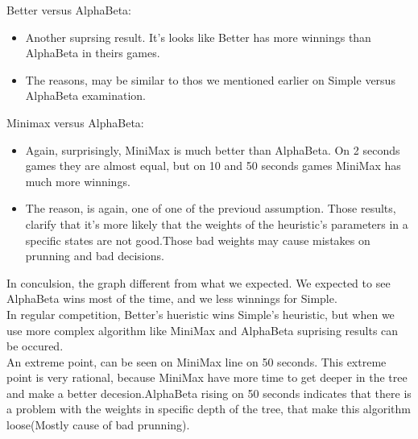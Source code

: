 \documentclass{article}
\begin{document}
Better versus AlphaBeta:
\begin{itemize}
\item Another suprsing result. It's looks like Better has more winnings than AlphaBeta in theirs games.
\item The reasons, may be similar to thos we mentioned earlier on Simple versus AlphaBeta examination.
\end{itemize}
\newpage
Minimax versus AlphaBeta:
\begin{itemize}
\item Again, surprisingly, MiniMax is much better than AlphaBeta. On 2 seconds games they are almost equal, but on 10 and 50 seconds games MiniMax has much more winnings. 
\item The reason, is again, one of one of the previoud assumption. Those results, clarify that it's more likely that the weights of the heuristic's parameters in a specific states are not good.Those bad weights may cause mistakes on prunning and bad decisions.
\end{itemize}

In conculsion, the graph different from what we expected. We expected to see AlphaBeta wins most of the time, and we less winnings for Simple.\\
In regular competition, Better's hueristic wins Simple's heuristic, but when we use more complex algorithm like MiniMax and AlphaBeta suprising results can be occured.\\
An extreme point, can be seen on MiniMax line on 50 seconds. This extreme point is very rational, because MiniMax have more time to get deeper in the tree and make a better decesion.AlphaBeta rising on 50 seconds indicates that there is a problem with the weights in specific depth of the tree, that make this algorithm loose(Mostly cause of bad prunning).
\end{document}
